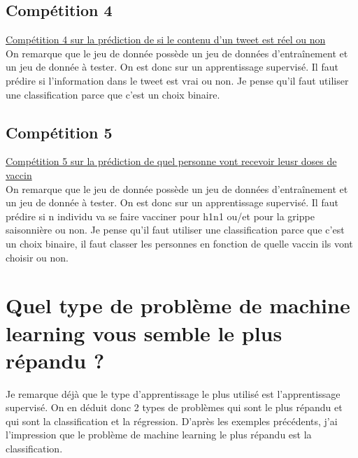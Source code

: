 \subsection{Compétition 4} 
\href{https://www.kaggle.com/competitions/nlp-getting-started}{Compétition 4 sur la prédiction de si le contenu d'un tweet est réel ou non}\\

On remarque que le jeu de donnée possède un jeu de données d’entraînement et un jeu de donnée à tester. On est donc sur un apprentissage supervisé. Il faut prédire si l’information dans le tweet est vrai ou non. Je pense qu’il faut utiliser une classification parce que c’est un choix binaire.


\subsection{Compétition 5} 
\href{https://www.drivendata.org/competitions/66/flu-shot-learning/page/211/}{Compétition 5 sur la prédiction de quel personne vont recevoir leusr doses de vaccin}\\

On remarque que le jeu de donnée possède un jeu de données d’entraînement et un jeu de donnée à tester. On est donc sur un apprentissage supervisé. Il faut prédire si n individu va se faire vacciner pour h1n1 ou/et pour la grippe saisonnière ou non. Je pense qu’il faut utiliser une classification parce que c’est un choix binaire, il faut classer les personnes en fonction de quelle vaccin ils vont choisir ou non.


\section{Quel type de problème de machine learning vous semble le plus répandu ?}
Je remarque déjà que le type d’apprentissage le plus utilisé est l’apprentissage supervisé. On en déduit donc 2 types de problèmes qui sont le plus répandu et qui sont la classification et la régression. D’après les exemples précédents, j’ai l’impression que le problème de machine learning le plus répandu est la classification.